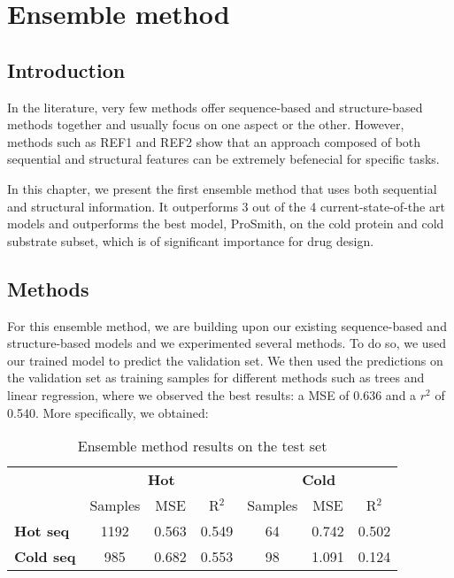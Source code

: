 
\chapter{Ensemble method}

\section{Introduction}

In the literature, very few methods offer sequence-based and structure-based methods together
and usually focus on one aspect or the other. However, methods such as REF1 and REF2 show
that an approach composed of both sequential and structural features can be extremely
befenecial for specific tasks.

In this chapter, we present the first ensemble method that uses both sequential and 
structural information. It outperforms 3 out of the 4 current-state-of-the art models and
outperforms the best model, ProSmith, on the cold protein and cold substrate subset, which
is of significant importance for drug design. 

\section{Methods}

For this ensemble method, we are building upon our existing sequence-based and structure-based models and we
experimented several methods. To do so, we used our trained model to predict the validation set. We then used
the predictions on the validation set as training samples for different methods such as trees and linear
regression, where we observed the best results: a MSE of 0.636 and a $r^2$ of 0.540. More specifically, we
obtained:

\begin{table}[ht]
  \centering
  \begin{tabular}{lcccccc}
  \hline
   & \multicolumn{3}{c}{\textbf{Hot}} & \multicolumn{3}{c}{\textbf{Cold}} \\
   & Samples & MSE & R\(^2\) & Samples & MSE & R\(^2\) \\ \hline
  \textbf{Hot seq}  & 1192 & 0.563 & 0.549 & 64 & 0.742 & 0.502 \\
  \textbf{Cold seq} & 985 & 0.682 & 0.553 & 98 & 1.091 & 0.124 \\ \hline
  \end{tabular}
  \caption{Ensemble method results on the test set}
  \label{tab:summary_performance}
\end{table}

